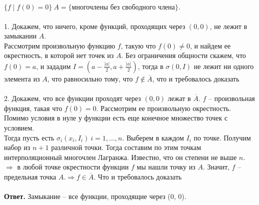 		\begin{figure}[h]
		\end{figure}
		$\{f\; |\; f(0) = 0\}\ A = \{\text{многочлены без свободного члена}\}.$\\
		\\		
		1. Докажем, что ничего, кроме функций, проходящих через $(0, 0)$, не лежит в замыкании $A.$\\		
		Рассмотрим произвольную функцию $f$, такую что $f(0) \ne 0$, и найдем ее окрестность, в которой нет точек из $A$. Без ограничения общности скажем, что $f(0) = a$, и зададим $I = (a - \frac{|a|}{2}, a + \frac{|a|}{2})$, тогда в $\sigma (0, I)$ не лежит ни одного элемента из $A$, что равносильно тому, что $f \notin \overline{A}$, что и требовалось доказать\\
		\\
		2. Докажем, что все функции проходят через $(0, 0)$ лежат в $\overline{A}$. $f$ -- произвольная функция, такая что $f(0) = 0$. Рассмотрим ее произвольную окрестность. Помимо условия в нуле у функции есть еще конечное множество точек с условием.\\		
		Тогда пусть есть $\sigma_{i}(x_{i}, I_{i})\ i = 1, ..., n$. Выберем в каждом $I_{i}$ по точке. Получим набор из $n + 1$ различной точки. Тогда составим по этим точкам интерполяционный многочлен Лагранжа. Известно, что он степени не выше $n$. $\Rightarrow$ в любой точке окрестности функции $f$ мы нашли точку из $A$. Значит, $f$ -- предельная точка $A. \Rightarrow f \in \overline{A}$. Что и требовалось доказать\\	
		\\	
		\textbf{Ответ.} Замыкание -- все функции, проходящие через (0, 0).
		
		
		
